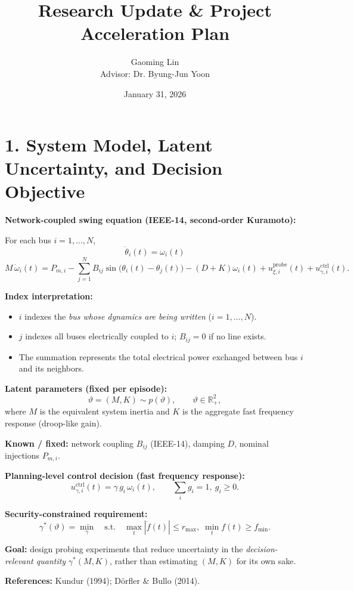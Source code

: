 \documentclass[12pt]{article}
\title{\Large Research Update \& Project Acceleration Plan}
\author{Gaoming Lin \\
\vspace{10pt} Advisor: Dr. Byung-Jun Yoon}
\date{January 31, 2026}
\begin{document}
\maketitle
\thispagestyle{firstpage}

\newpage
\section*{1. System Model, Latent Uncertainty, and Decision Objective}

\textbf{Network-coupled swing equation (IEEE-14, second-order Kuramoto):}

For each bus $i=1,\dots,N$,
\[
\dot{\theta}_i(t)=\omega_i(t)
\]
\[
M\,\dot{\omega}_i(t)=
P_{m,i}
-\sum_{j=1}^{N}B_{ij}\sin\!\big(\theta_i(t)-\theta_j(t)\big)
-(D+K)\omega_i(t)
+u^{\text{probe}}_{\xi,i}(t)
+u^{\text{ctrl}}_{\gamma,i}(t).
\]

\textbf{Index interpretation:}
\begin{itemize}
\item $i$ indexes the \emph{bus whose dynamics are being written} ($i=1,\dots,N$).
\item $j$ indexes all buses electrically coupled to $i$; $B_{ij}=0$ if no line exists.
\item The summation represents the total electrical power exchanged between bus $i$ and its neighbors.
\end{itemize}

\textbf{Latent parameters (fixed per episode):}
\[
\vartheta=(M,K)\sim p(\vartheta), \qquad \vartheta\in\mathbb{R}_+^2,
\]
where $M$ is the equivalent system inertia and $K$ is the aggregate fast frequency response (droop-like gain).

\textbf{Known / fixed:}
network coupling $B_{ij}$ (IEEE-14), damping $D$, nominal injections $P_{m,i}$.

\vspace{0.4em}
\textbf{Planning-level control decision (fast frequency response):}
\[
u^{\text{ctrl}}_{\gamma,i}(t)=\gamma\,g_i\,\omega_i(t),
\qquad \sum_i g_i = 1,\ g_i\ge0.
\]

\textbf{Security-constrained requirement:}
\[
\gamma^*(\vartheta)=
\min_{\gamma}
\quad \text{s.t.}\quad
\max_t|\dot f(t)|\le r_{\max},\;
\min_t f(t)\ge f_{\min}.
\]

\textbf{Goal:}
design probing experiments that reduce uncertainty in the
\emph{decision-relevant quantity} $\gamma^*(M,K)$, rather than estimating
$(M,K)$ for its own sake.

\textbf{References:}
Kundur (1994); Dörfler \& Bullo (2014).
\end{document}
